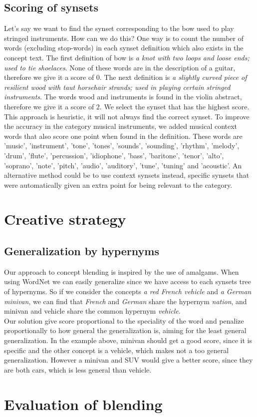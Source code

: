\subsection{Scoring of synsets}
Let's say we want to find the synset corresponding to the bow used to play stringed instruments. How can we do this? One way is to count the number of words (excluding stop-words) in each synset definition which also exists in the concept text. The first definition of bow is \emph{a knot with two loops and loose ends; used to tie shoelaces}. None of these words are in the description of a guitar, therefore we give it a score of 0. The next definition is \emph{a slightly curved piece of resilient wood with taut horsehair strands; used in playing certain stringed instruments}. The words wood and instruments is found in the violin abstract, therefore we give it a score of 2. We select the synset that has the highest score. This approach is heuristic, it will not always find the correct synset.
To improve the accuracy in the category musical instruments, we added musical context words that also score one point when found in the definition. These words are 'music', 'instrument', 'tone', 'tones', 'sounds', 'sounding', 'rhythm', 'melody', 'drum', 'flute', 'percussion', 'idiophone',
'bass', 'baritone', 'tenor', 'alto', 'soprano', 'note', 'pitch', 'audio', 'auditory', 'tune', 'tuning' and 'acoustic'.
An alternative method could be to use context synsets instead, specific synsets that were automatically given an extra point for being relevant to the category.


\section{Creative strategy}
\subsection{Generalization by hypernyms}
Our approach to concept blending is inspired by the use of amalgams. When using WordNet we can easily generalize since we have access to each synsets tree of hypernyms. So if we consider the concepts \emph{a red French vehicle} and \emph{a German minivan}, we can find that \emph{French} and \emph{German} share the hypernym \emph{nation}, and minivan and vehicle share the common hypernym \emph{vehicle}.\\
Our solution give score proportional to the speciality of the word and penalize proportionally to how general the generalization is, aiming for the least general generalization. In the example above, minivan should get a good score, since it is specific and the other concept is a vehicle, which makes not a too general generalization. However a minivan and SUV would give a better score, since they are both cars, which is less general than vehicle.


\section{Evaluation of blending}

